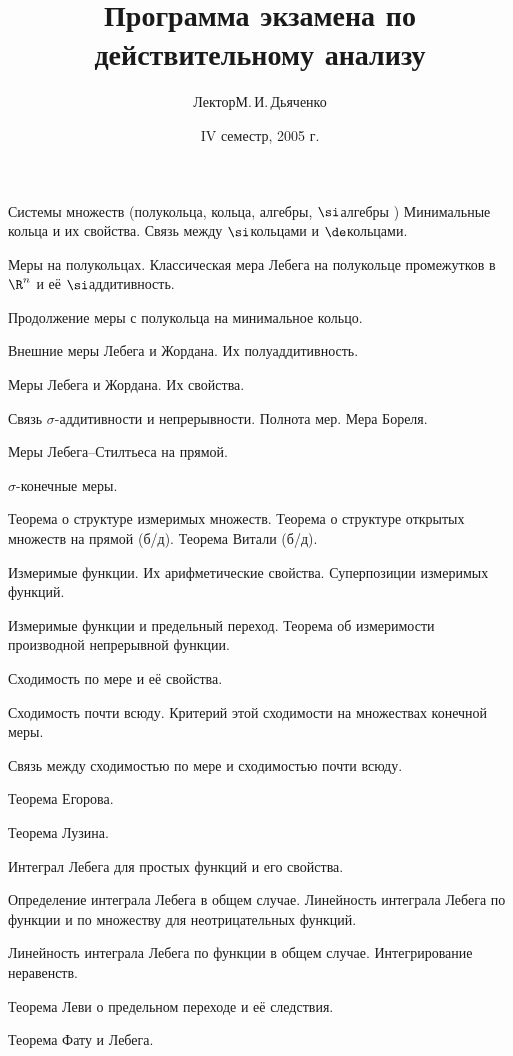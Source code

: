 \documentclass[a4paper]{article}
\title{Программа экзамена по действительному анализу}
\author{Лектор\т М.\,И.\,Дьяченко}
\date{IV семестр, 2005 г.}
\begin{document}
\maketitle


\begin{nums}{-1}
\item Системы множеств (полукольца, кольца, алгебры, $\si$\д алгебры )
Минимальные кольца и их свойства. Связь между $\si$\д кольцами и $\de$\д кольцами.
\item Меры на полукольцах. Классическая мера Лебега на полукольце промежутков в
$\R^n$ и её $\si$\д аддитивность.
\item Продолжение меры с полукольца на минимальное кольцо.
\item Внешние меры Лебега и Жордана. Их полуаддитивность.
\item Меры Лебега и Жордана. Их свойства.
\item Связь $\sigma $-аддитивности и непрерывности. Полнота мер. Мера Бореля.
\item Меры Лебега--Стилтьеса на прямой.
\item $\sigma $-конечные меры.
\item Теорема о структуре измеримых множеств. Теорема о структуре открытых множеств на прямой (б/д). Теорема Витали (б/д).
\item Измеримые функции. Их арифметические свойства. Суперпозиции измеримых функций.
\item Измеримые функции и предельный переход. Теорема об измеримости производной непрерывной функции.
\item Сходимость по мере и её свойства.
\item Сходимость почти всюду. Критерий этой сходимости на множествах конечной меры.
\item Связь между сходимостью по мере и сходимостью почти всюду.
\item Теорема Егорова.
\item Теорема Лузина.
\item Интеграл Лебега для простых функций и его свойства.
\item Определение интеграла Лебега в общем случае. Линейность интеграла Лебега
по функции и по множеству для неотрицательных функций.
\item Линейность интеграла Лебега по функции в общем случае. Интегрирование неравенств.
\item Теорема Леви о предельном переходе и её следствия.
\item Теорема Фату и Лебега.

\end{nums}
\end{document}
